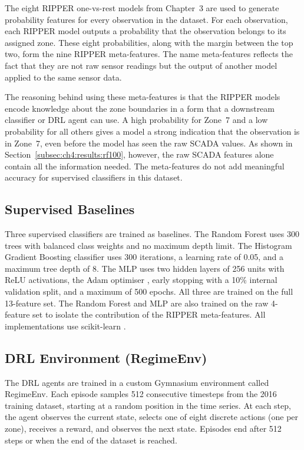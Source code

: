 The eight RIPPER one-vs-rest models from Chapter~3 are used to generate probability
features for every observation in the dataset. For each observation, each RIPPER model
outputs a probability that the observation belongs to its assigned zone. These eight
probabilities, along with the margin between the top two, form the nine RIPPER
meta-features. The name meta-features reflects the fact that they are not raw sensor
readings but the output of another model applied to the same sensor data.

The reasoning behind using these meta-features is that the RIPPER models encode knowledge
about the zone boundaries in a form that a downstream classifier or DRL agent can use. A
high probability for Zone~7 and a low probability for all others gives a model a strong
indication that the observation is in Zone~7, even before the model has seen the raw
SCADA values. As shown in Section~\ref{subsec:ch4:results:rf100}, however, the raw SCADA
features alone contain all the information needed. The meta-features do not add meaningful
accuracy for supervised classifiers in this dataset.

\subsection{Supervised Baselines}
\label{subsec:ch4:baselines}

Three supervised classifiers are trained as baselines. The Random Forest uses 300 trees
with balanced class weights and no maximum depth limit. The Histogram Gradient Boosting
classifier uses 300 iterations, a learning rate of 0.05, and a maximum tree depth of 8.
The MLP uses two hidden layers of 256 units with ReLU activations, the Adam optimiser
\citep{kingma2014}, early stopping with a 10\% internal validation split, and a maximum
of 500 epochs. All three are trained on the full 13-feature set. The Random Forest and
MLP are also trained on the raw 4-feature set to isolate the contribution of the RIPPER
meta-features. All implementations use scikit-learn \citep{pedregosa2011}.

\subsection{DRL Environment (RegimeEnv)}
\label{subsec:ch4:env}

The DRL agents are trained in a custom Gymnasium \citep{towers2023} environment called
RegimeEnv. Each episode samples 512 consecutive timesteps from the 2016 training dataset,
starting at a random position in the time series. At each step, the agent observes the
current state, selects one of eight discrete actions (one per zone), receives a reward,
and observes the next state. Episodes end after 512 steps or when the end of the dataset
is reached.

